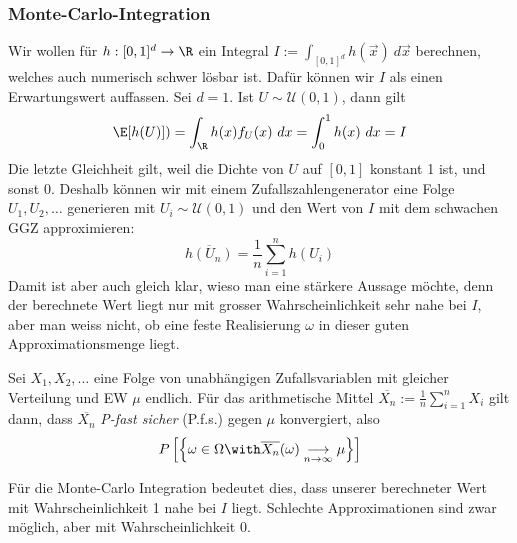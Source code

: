 \subsubsection*{Monte-Carlo-Integration}
Wir wollen für $h:[0,1]^d \to \R$ ein Integral $I:= \int_{[0,1]^d} h(\vec{x}) \ d\vec{x}$ berechnen, welches auch numerisch schwer lösbar ist. Dafür können wir $I$ als einen Erwartungswert auffassen. Sei $d=1$. Ist $U \sim \mathcal{U}(0,1)$, dann gilt 
$$ \E[h(U)] ) = \int_{\R} h(x)f_U(x) \ dx = \int_0^1 h(x) \ dx = I$$
Die letzte Gleichheit gilt, weil die Dichte von $U$ auf $[0,1]$ konstant 1 ist, und sonst 0. Deshalb können wir mit einem Zufallszahlengenerator eine Folge $U_1,U_2,\dots$ generieren mit $U_i \sim \mathcal{U}(0,1)$ und den Wert von $I$ mit dem schwachen GGZ approximieren:
$$ \overline{h(U_n)} = \frac{1}{n} \sum_{i=1}^n h(U_i)$$ 
Damit ist aber auch gleich klar, wieso man eine stärkere Aussage möchte, denn der berechnete Wert liegt nur mit grosser Wahrscheinlichkeit sehr nahe bei $I$, aber man weiss nicht, ob eine feste Realisierung $\omega$ in dieser guten Approximationsmenge liegt.

\begin{satz}
Sei $X_1,X_2,\dots$ eine Folge von unabhängigen Zufallsvariablen mit gleicher Verteilung und EW $\mu$ endlich. Für das arithmetische Mittel $\overline{X_n} := \frac{1}{n} \sum_{i=1}^n X_i$ gilt dann, dass $\overline{X_n}$ \textit{P-fast sicher} (P.f.s.) gegen $\mu$ konvergiert, also
$$ P \left[ \left \{ \omega \in \Omega \with \overline{X_n}(\omega) \underset{n\to\infty}{\longrightarrow} \mu \right \} \right] $$
\end{satz}
Für die Monte-Carlo Integration bedeutet dies, dass unserer berechneter Wert mit Wahrscheinlichkeit 1 nahe bei $I$ liegt. Schlechte Approximationen sind zwar möglich, aber mit Wahrscheinlichkeit 0.

